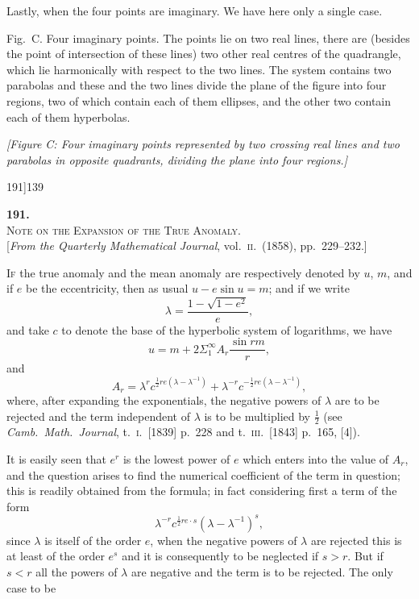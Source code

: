 \documentclass[11pt]{article}
\begin{document}
\medskip
Lastly, when the four points are imaginary. We have here only a single case.

Fig.\ C. Four imaginary points. The points lie on two real lines, there are (besides
the point of intersection of these lines) two other real centres of the quadrangle, which
lie harmonically with respect to the two lines. The system contains two parabolas
and these and the two lines divide the plane of the figure into four regions, two of
which contain each of them ellipses, and the other two contain each of them hyperbolas.

\medskip
\textit{[Figure C: Four imaginary points represented by two crossing real lines and two parabolas in opposite quadrants, dividing the plane into four regions.]}

\bigskip
\begin{center}\small\textsc{191}]\hfill\textsc{139}\end{center}

\begin{center}
\textbf{191.}\\[0.5em]
\textsc{Note on the Expansion of the True Anomaly.}\\[0.4em]
\small [\textit{From the Quarterly Mathematical Journal}, vol.\ \textsc{ii}.\ (1858), pp.\ 229--232.]
\end{center}

\medskip
\noindent \textsc{If} the true anomaly and the mean anomaly are respectively denoted by $u$, $m$,
and if $e$ be the eccentricity, then as usual $u - e \sin u = m$; and if we write
\[
\lambda = \frac{1 - \sqrt{1 - e^{2}}}{e},
\]
and take $c$ to denote the base of the hyperbolic system of logarithms, we have
\[
u = m + 2\Sigma_{1}^{\infty} A_{r}\frac{\sin r m}{r},
\]
and
\[
A_{r} = \lambda^{r} c^{\frac{1}{2}r e(\lambda - \lambda^{-1})} + \lambda^{-r} c^{-\frac{1}{2}r e(\lambda - \lambda^{-1})},
\]
where, after expanding the exponentials, the negative powers of $\lambda$ are to be rejected
and the term independent of $\lambda$ is to be multiplied by $\tfrac{1}{2}$ (see \textit{Camb.\ Math.\ Journal},
t.\ \textsc{i}.\ [1839] p.\ 228 and t.\ \textsc{iii}.\ [1843] p.\ 165, [4]).

It is easily seen that $e^{r}$ is the lowest power of $e$ which enters into the value
of $A_{r}$, and the question arises to find the numerical coefficient of the term in
question; this is readily obtained from the formula; in fact considering first a term
of the form
\[
\lambda^{-r} c^{\frac{1}{2}r e \cdot s}(\lambda - \lambda^{-1})^{s},
\]
since $\lambda$ is itself of the order $e$, when the negative powers of $\lambda$ are rejected this is at
least of the order $e^{s}$ and it is consequently to be neglected if $s > r$. But if $s < r$ all
the powers of $\lambda$ are negative and the term is to be rejected. The only case to be
\end{document}
